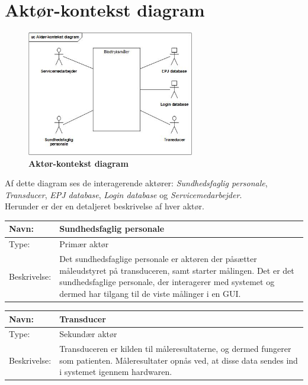 \newpage

\section{Aktør-kontekst diagram}
\begin{figure}[h!]
\includegraphics[width =0.65\textwidth , left]{billeder/Aktorkontekst.jpg}
\caption{\textbf{Aktør-kontekst diagram}}
\end{figure}

Af dette diagram ses de interagerende aktører: \textit{Sundhedsfaglig personale}, \textit{Transducer}, \textit{EPJ database}, \textit{Login database} og \textit{Servicemedarbejder}.\\ Herunder er der en detaljeret beskrivelse af hver aktør.

\begin{table}[h!]
\begin{tabular}{| >{\raggedright\arraybackslash}p{3cm} | >{\raggedright\arraybackslash}p{12cm} |}
   \hline
   Navn: & Sundhedsfaglig personale\\ \hline
   Type: & Primær aktør \\ \hline
   Beskrivelse: & Det sundhedsfaglige personale er aktøren der påsætter måleudstyret på transduceren, samt starter målingen. Det er det sundhedsfaglige personale, der interagerer med systemet og dermed har tilgang til de viste målinger i en GUI.\\ \hline
\end{tabular}
\end{table}


\begin{table}[h!]
\begin{tabular}{| >{\raggedright\arraybackslash}p{3cm} | >{\raggedright\arraybackslash}p{12cm} |}
   \hline
   Navn: & Transducer\\ \hline
   Type: & Sekundær aktør \\ \hline
   Beskrivelse: & Transduceren er kilden til måleresultaterne, og dermed fungerer som patienten. Måleresultater opnås ved, at disse data sendes ind i systemet igennem hardwaren.\\ \hline
\end{tabular}
\end{table}


